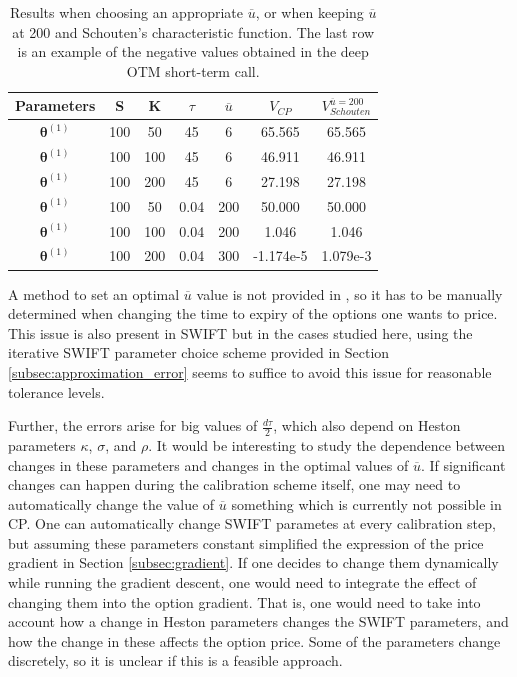 \documentclass[12,twoside]{mammeTFM}
\theoremstyle{definition}
\theoremstyle{remark}
\begin{document}
\begin{table}[!h]
\begin{center}
 \begin{tabular}{|c | c | c | c | c | c | c |} 
 \hline
 Parameters & S & K & $\tau$ & $\overline{u}$ & $V_{CP}$ & $V_{Schouten}^{\overline{u} = 200}$ \\ [0.5ex] 
 \hline
 $\boldsymbol{\theta}^{(1)}$ & 100 & 50  & 45  & 6 & 65.565 & 65.565 \\ 
 \hline
 $\boldsymbol{\theta}^{(1)}$ & 100 & 100 & 45   & 6 & 46.911 & 46.911 \\ 
 \hline
 $\boldsymbol{\theta}^{(1)}$ & 100 & 200 & 45   & 6 & 27.198 & 27.198 \\ 
 \hline
 $\boldsymbol{\theta}^{(1)}$ & 100 & 50  & 0.04 & 200 & 50.000 & 50.000 \\ 
 \hline
 $\boldsymbol{\theta}^{(1)}$ & 100 & 100 & 0.04 & 200 & 1.046 & 1.046 \\ 
 \hline
 $\boldsymbol{\theta}^{(1)}$ & 100 & 200 & 0.04 & 300 & -1.174e-5 & 1.079e-3 \\
 \hline
\end{tabular}
\end{center}
\caption{Results when choosing an appropriate $\overline{u}$, or when keeping $\overline{u}$ at 200 and Schouten's characteristic function. The last row is an example of the negative values obtained in the deep OTM short-term call.}\label{table:second_attempt}
\end{table}

A method to set an optimal $\overline{u}$ value is not provided in \cite{cui17}, so it has to be manually determined when changing the time to expiry of the options one wants to price. This issue is also present in SWIFT but in the cases studied here, using the iterative SWIFT parameter choice scheme provided in Section \ref{subsec:approximation_error} seems to suffice to avoid this issue for reasonable tolerance levels.

Further, the errors arise for big values of $\frac{d \tau}{2}$, which also depend on Heston parameters $\kappa$, $\sigma$, and $\rho$. It would be interesting to study the dependence between changes in these parameters and changes in the optimal values of $\overline{u}$. If significant changes can happen during the calibration scheme itself, one may need to automatically change the value of $\overline{u}$ something which is currently not possible in CP. One can automatically change SWIFT parametes at every calibration step, but assuming these parameters constant simplified the expression of the price gradient in Section \ref{subsec:gradient}. If one decides to change them dynamically while running the gradient descent, one would need to integrate the effect of changing them into the option gradient. That is, one would need to take into account how a change in Heston parameters changes the SWIFT parameters, and how the change in these affects the option price. Some of the parameters change discretely, so it is unclear if this is a feasible approach.
\end{document}
